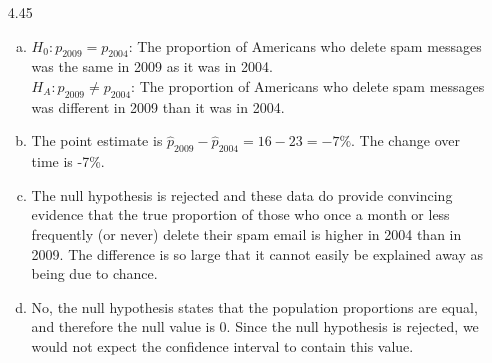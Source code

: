 \documentclass[11pt]{article}
\newenvironment{parts}{
\vspace{-0.25cm}
\begin{enumerate}[(a)]
\setlength{\itemsep}{0mm}
}
{\end{enumerate}
}
\begin{document}
\begin{enumerate}
\item[4.45]
\begin{parts}
\item $H_0: p_{2009} = p_{2004}$: The proportion of Americans who delete spam messages was the same in 2009 as it was in 2004. \\
 $H_A: p_{2009} \ne p_{2004}$: The proportion of Americans who delete spam messages was different in 2009 than it was in 2004.
 \item The point estimate is $\hat{p}_{2009} - \hat{p}_{2004} = 16 - 23 = -7\%$. The change over time is -7\%.
\item The null hypothesis is rejected and these data do provide convincing evidence that the true proportion of those who once a month or less frequently (or never) delete their spam email is higher in 2004 than in 2009. The difference is so large that it cannot easily be explained away as being due to chance.
\item No, the null hypothesis states that the population proportions are equal, and therefore the null value is 0. Since the null hypothesis is  rejected, we would not expect the confidence interval to contain this value.
\end{parts}

%

\end{enumerate}
\end{document}
